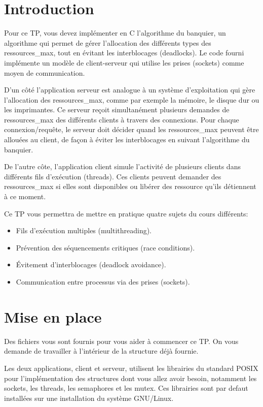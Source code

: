 \documentclass{article}
\begin{document}
\newpage
\section{Introduction}

Pour ce TP, vous devez implémenter en C l’algorithme du banquier, un
algorithme qui permet de gérer l’allocation des différents types des
ressources_max, tout en évitant les interblocages (deadlocks).  Le code fourni
implémente un modèle de client-serveur qui utilise les prises (sockets)
comme moyen de communication.

D’un côté l’application serveur est analogue à un système d’exploitation qui
gère l’allocation des ressources_max, comme par exemple la mémoire, le disque
dur ou les imprimantes.  Ce serveur reçoit simultanément plusieurs demandes
de ressources_max des différents clients à travers des connexions.  Pour chaque
connexion/requête, le serveur doit décider quand les ressources_max peuvent être
allouées au client, de façon à éviter les interblocages en suivant
l’algorithme du banquier.

De l’autre côte, l’application client simule l’activité de plusieurs clients
dans différents fils d’exécution (threads).  Ces clients peuvent demander des
ressources_max si elles sont disponibles ou libérer des ressource qu’ils
détiennent à ce moment.

Ce TP vous permettra de mettre en pratique quatre sujets du cours différents:
\begin{itemize}
\item Fils d’exécution multiples (multithreading).
\item Prévention des séquencements critiques (race conditions).
\item Évitement d’interblocages (deadlock avoidance).
\item Communication entre processus via des prises (sockets).
\end{itemize}

\section{Mise en place}

Des fichiers vous sont fournis pour vous aider à commencer ce TP.
On vous demande de travailler à l’intérieur de la structure déjà fournie.

Les deux applications, client et serveur, utilisent les librairies du
standard POSIX pour l’implémentation des structures dont vous allez avoir
besoin, notamment les sockets, les threads, les semaphores et les mutex.
Ces librairies sont par defaut installées sur une installation du système
GNU/Linux.
\end{document}
